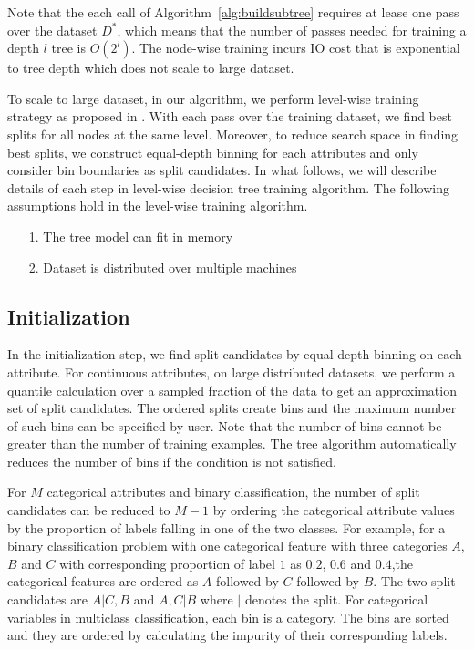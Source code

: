 
Note that the each call of Algorithm~\ref{alg:buildsubtree} requires at lease
one pass over the dataset $D^*$, which means that the number of passes needed
for training a depth $l$ tree is $O(2^l)$. The node-wise training incurs IO
cost that is exponential to tree depth which does not scale to large dataset.

To scale to large dataset, in our algorithm, we perform level-wise training
strategy as proposed in \cite{panda2009planet}. With each
pass over the training dataset, we find best splits for all nodes at the same
level. Moreover, to reduce search space in finding best splits, we construct
equal-depth binning for each attributes and only consider bin boundaries as split
candidates. In what follows, we will describe details of each step in level-wise
decision tree training algorithm. The following assumptions hold in the level-wise
training algorithm.

\begin{itemize}
\item[1.] The tree model can fit in memory
\item[2.] Dataset is distributed over multiple machines
\end{itemize}

\subsection{Initialization}
In the initialization step, we find split candidates by equal-depth binning on
each attribute. For continuous attributes, on large distributed datasets, we
perform a quantile calculation over a sampled fraction of the data to get an
approximation set of split candidates. The ordered splits create bins and the
maximum number of such bins can be specified by user. Note that the number of
bins cannot be greater than the number of training examples. The tree algorithm
automatically reduces the number of bins if the condition is not satisfied.

For $M$ categorical attributes and binary classification, the number of split
candidates can be reduced to $M-1$ by ordering the categorical attribute values
by the proportion of labels falling in one of the two classes. For example, for
a binary classification problem with one categorical feature with three
categories $A$, $B$ and $C$ with corresponding proportion of label $1$ as $0.2$,
$0.6$ and $0.4$,the categorical features are ordered as $A$ followed by $C$
followed by $B$. The two split candidates are $A|C,B$ and $A,C|B$
where $|$ denotes the split. For categorical variables in multiclass classification,
each bin is a category. The bins are sorted and they are ordered by calculating
the impurity of their corresponding labels.

